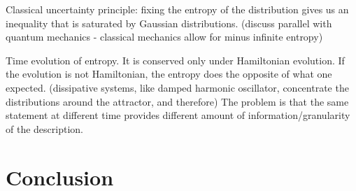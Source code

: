 \documentclass{article}
\begin{document}
Classical uncertainty principle: fixing the entropy of the distribution gives us an inequality that is saturated by Gaussian distributions. (discuss parallel with quantum mechanics - classical mechanics allow for minus infinite entropy)

Time evolution of entropy. It is conserved only under Hamiltonian evolution. If the evolution is not Hamiltonian, the entropy does the opposite of what one expected. (dissipative systems, like damped harmonic oscillator, concentrate the distributions around the attractor, and therefore) The problem is that the same statement at different time provides different amount of information/granularity of the description.


\section{Conclusion}
	
\end{document}
